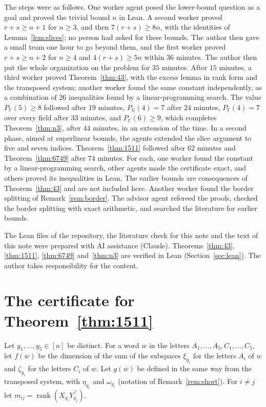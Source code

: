 \documentclass[11pt]{amsart}
\theoremstyle{remark}
\newcommand{\F}{\mathbb{F}}
\newcommand{\Q}{\mathbb{Q}}
\newcommand{\rk}{\operatorname{rank}}
\begin{document}
The steps were as follows. One worker agent posed the lower-bound question as a goal and proved the trivial
bound $n$ in Lean. A second worker proved $r+s\ge n+1$ for $n\ge3$, and then $7(r+s)\ge8n$, with the
identities of Lemma~\ref{lem:slices}; no person had asked for these bounds. The author then gave a small team
one hour to go beyond them, and the first worker proved $r+s\ge n+2$ for $n\ge4$ and $4(r+s)\ge5n$ within
$36$ minutes. The author then put the whole organization on the problem for $35$ minutes. After $15$
minutes, a third worker proved Theorem~\ref{thm:43}, with the excess lemma in rank form and the transposed
system; another worker found the same constant independently, as a combination of $26$ inequalities found by
a linear-programming search. The value $P_\F(5)\ge8$ followed after $19$ minutes, $P_\Q(4)=7$ after $24$
minutes, $P_\F(4)=7$ over every field after $33$ minutes, and $P_\F(6)\ge9$, which completes
Theorem~\ref{thm:n3}, after $44$ minutes, in an extension of the time. In a second phase, aimed at
superlinear bounds, the agents extended the slice argument to five and seven indices.
Theorem~\ref{thm:1511} followed after $62$ minutes and Theorem~\ref{thm:6749} after $74$ minutes. For each, one
worker found the constant by a linear-programming search, other agents made the certificate exact, and
others proved its inequalities in Lean. The earlier bounds are consequences of
Theorem~\ref{thm:43} and are not included here. Another worker found the border splitting of
Remark~\ref{rem:border}. The advisor agent refereed the proofs, checked the border splitting with exact
arithmetic, and searched the literature for earlier bounds.

The Lean files of the repository, the literature check for this note and the text of this note were
prepared with AI assistance (Claude). Theorems~\ref{thm:43}, \ref{thm:1511}, \ref{thm:6749} and~\ref{thm:n3}
are verified in Lean (Section~\ref{sec:lean}). The author takes responsibility for the content.

\appendix

\section{The certificate for Theorem~\ref{thm:1511}}\label{app:1511}

Let $y_1,\dots,y_5\in[n]$ be distinct. For a word $w$ in the letters $A_1,\dots,A_5,C_1,\dots,C_5$, let $f(w)$
be the dimension of the sum of the subspaces $\xi_{y_i}$ for the letters $A_i$ of $w$ and $\zeta_{y_i}$ for the
letters $C_i$ of $w$. Let $g(w)$ be defined in the same way from the transposed system, with $\eta_{y_i}$ and
$\omega_{y_i}$ (notation of Remark~\ref{rem:short}). For $i\ne j$ let $m_{ij}=\rk(X_{y_i}Y_{y_j}^{\top})$.
\end{document}
